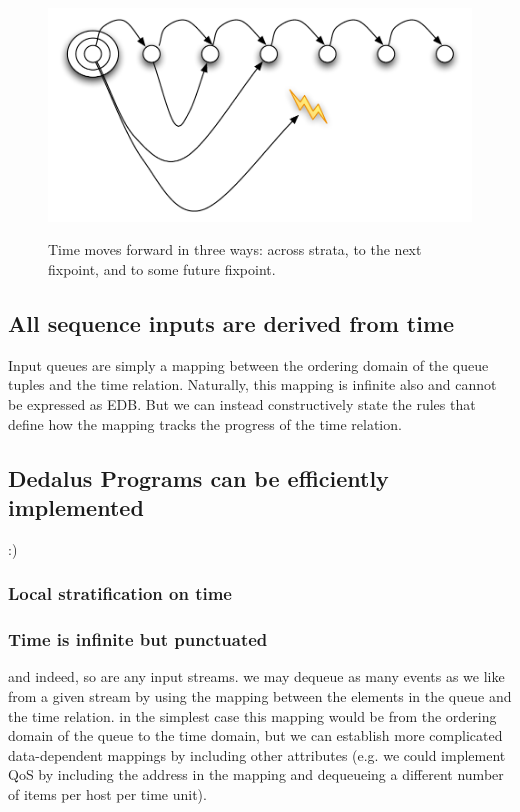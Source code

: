 \documentclass{acm_proc_article-sp-sigmod09}
\begin{document}
\begin{figure}[t]
  \centering
  \includegraphics[width=0.75\linewidth]{dedalus-time.pdf}
  \label{fig:dedalus-time}
  \caption{Time moves forward in three ways: across strata, to the next fixpoint, and to some future fixpoint.}
\vspace{-8pt}
\end{figure}


\subsection{All sequence inputs are derived from time}

Input queues are simply a mapping between the ordering domain of the queue tuples and the time relation.  Naturally, this mapping
is infinite also and cannot be expressed as EDB.  But we can instead constructively state the rules that define how the mapping 
tracks the progress of the time relation.

\subsection{Dedalus Programs can be efficiently implemented}

:)

\subsubsection{Local stratification on time}

\subsubsection{Time is infinite but punctuated}

and indeed, so are any input streams.  we may dequeue as many events as we like from a given stream by using the mapping
between the elements in the queue and the time relation.  in the simplest case this mapping would be from the ordering domain 
of the queue to the time domain, but we can establish more complicated data-dependent mappings by including other attributes 
(e.g. we could implement QoS by including the address in the mapping and dequeueing a different number of items per host
per time unit).
\end{document}
